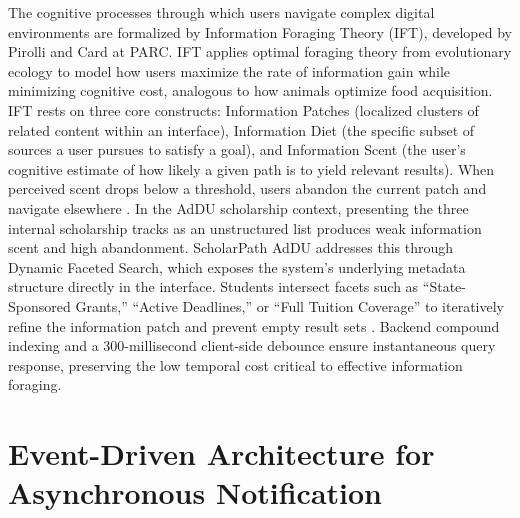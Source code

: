 The cognitive processes through which users navigate complex digital environments are formalized by Information Foraging Theory (IFT), developed by Pirolli and Card \cite{ref37} at PARC. IFT applies optimal foraging theory from evolutionary ecology to model how users maximize the rate of information gain while minimizing cognitive cost, analogous to how animals optimize food acquisition. IFT rests on three core constructs: Information Patches (localized clusters of related content within an interface), Information Diet (the specific subset of sources a user pursues to satisfy a goal), and Information Scent (the user's cognitive estimate of how likely a given path is to yield relevant results). When perceived scent drops below a threshold, users abandon the current patch and navigate elsewhere \cite{ref37}. In the AdDU scholarship context, presenting the three internal scholarship tracks as an unstructured list produces weak information scent and high abandonment. ScholarPath AdDU addresses this through Dynamic Faceted Search, which exposes the system's underlying metadata structure directly in the interface. Students intersect facets such as ``State-Sponsored Grants,'' ``Active Deadlines,'' or ``Full Tuition Coverage'' to iteratively refine the information patch and prevent empty result sets \cite{ref4,ref43}. Backend compound indexing and a 300-millisecond client-side debounce ensure instantaneous query response, preserving the low temporal cost critical to effective information foraging.

\section{Event-Driven Architecture for Asynchronous Notification}

